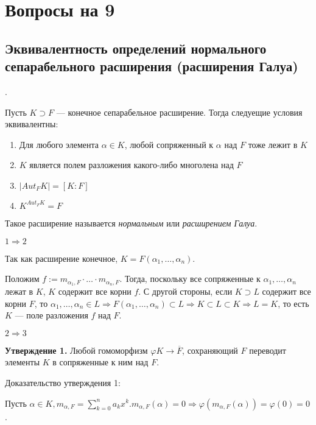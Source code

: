\documentclass[../main.tex]{subfiles}
\begin{document}
\setcounter{section}{8}
\section{Вопросы на 9}

    \hypertarget{9.1}{\subsection{Эквивалентность определений нормального
    сепарабельного расширения (расширения Галуа)}}.

    Пусть $K \supset F$ --- конечное сепарабельное расширение.
    Тогда следуещие условия эквивалентны:

    \begin{enumerate}
        \item Для любого элемента $\alpha \in K$, любой сопряженный к $\alpha$
        над $F$ тоже лежит в $K$

        \item $K$ является полем разложения какого-либо многолена над $F$

        \item $|Aut_FK| = [K : F]$

        \item $K^{Aut_FK} = F$
    \end{enumerate}

    Такое расширение называется \textit{нормальным}
    или \textit{расширением Галуа}.

    $1 \Rightarrow 2$

    Так как расширение конечное, $K = F(\alpha_1, \ldots, \alpha_n)$.

    Положим $f := m_{\alpha_1, F} \cdot \ldots \cdot m_{\alpha_n, F}$.
    Тогда, поскольку все сопряженные к $\alpha_1, \ldots, \alpha_n$
    лежат в $K$, $K$ содержит все корни $f$. С другой стороны, если
    $K \supset L$ содержит все корни $F$, то $\alpha_1, \ldots, \alpha_n
    \in L \Rightarrow F(\alpha_1, \ldots, \alpha_n) \subset L \Rightarrow
    K \subset L \subset K \Rightarrow L = K$,
    то есть $K$ --- поле разложения $f$ над $F$.

    $2 \Rightarrow 3$

    \textbf{Утверждение 1.} Любой гомоморфизм $\varphi K \to \overline{F}$,
    сохраняющий $F$ переводит элементы $K$ в сопряженные к ним над $F$.

    Доказательство утверждения 1:

    Пусть $\alpha \in K, m_{\alpha, F} = \sum\limits_{k=0}^n a_kx^k.
    m_{\alpha, F}(\alpha) = 0 \Rightarrow \varphi(m_{\alpha, F}(\alpha))
    = \varphi(0) = 0$.
\end{document}
